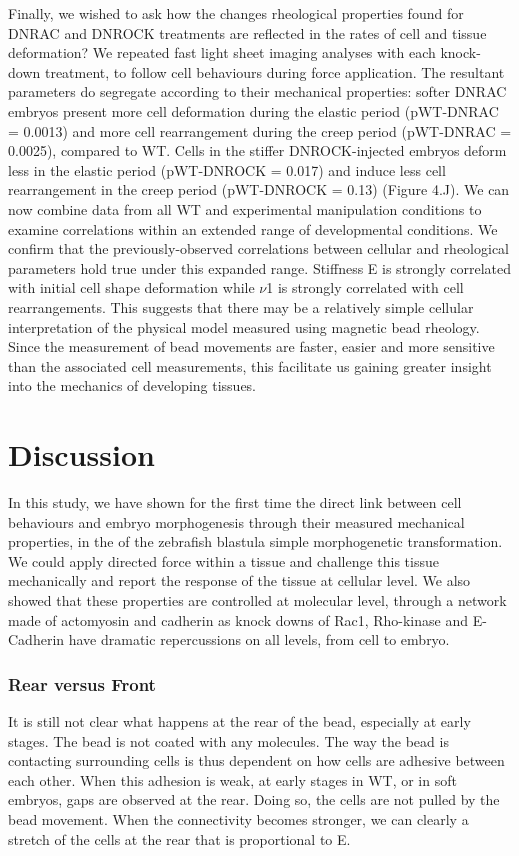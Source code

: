 Finally, we wished to ask how the changes rheological properties found for DNRAC and DNROCK treatments are reflected in the rates of cell and tissue deformation?
We repeated fast light sheet imaging analyses with each knock-down treatment, to follow cell behaviours during force application.
The resultant parameters do segregate according to their mechanical properties: softer DNRAC embryos present more cell deformation during the elastic period (pWT-DNRAC = 0.0013) and more cell rearrangement during the creep period (pWT-DNRAC = 0.0025), compared to WT.
Cells in the stiffer DNROCK-injected embryos deform less in the elastic period (pWT-DNROCK = 0.017) and induce less cell rearrangement in the creep period (pWT-DNROCK = 0.13) (Figure 4.J).
We can now combine data from all WT and experimental manipulation conditions to examine correlations within an extended range of developmental conditions.
We confirm that the previously-observed correlations between cellular and rheological parameters hold true under this expanded range.
Stiffness E is strongly correlated with initial cell shape deformation while $\nu$1 is strongly correlated with cell rearrangements.
This suggests that there may be a relatively simple cellular interpretation of the physical model measured using magnetic bead rheology.
Since the measurement of bead movements are faster, easier and more sensitive than the associated cell measurements, this facilitate us gaining greater insight into the mechanics of developing tissues.
\section{Discussion}
In this study, we have shown for the first time the direct link between cell behaviours and embryo morphogenesis through their measured mechanical properties, in the of the zebrafish blastula simple morphogenetic transformation.
We could apply directed force within a tissue and challenge this tissue mechanically and report the response of the tissue at cellular level.
We also showed that these properties are controlled at molecular level, through a network made of actomyosin and cadherin as knock downs of Rac1, Rho-kinase and E-Cadherin have dramatic repercussions on all levels, from cell to embryo.


\subsubsection{Rear versus Front}
It is still not clear what happens at the rear of the bead, especially at early stages.
The bead is not coated with any molecules.
The way the bead is contacting surrounding cells is thus dependent on how cells are adhesive between each other.
When this adhesion is weak, at early stages in WT, or in soft embryos, gaps are observed at the rear.
Doing so, the cells are not pulled by the bead movement. When the connectivity becomes stronger, we can clearly a stretch of the cells at the rear that is proportional to E.

